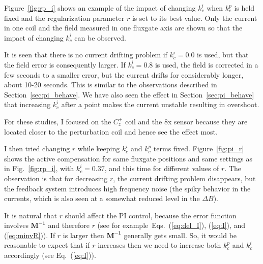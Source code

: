 Figure~\ref{fig:rp_i} shows an example of the impact of changing
$k_c^i$ when $k_c^p$ is held fixed and the regularization parameter
$r$ is set to its best value.  Only the current in one coil and the
field measured in one fluxgate axis are shown so that the impact of
changing $k_c^i$ can be observed.

It is seen that there is no current drifting problem if $k_c^i=0.0$ is
used, but that the field error is consequently larger.  If $k_c^i=0.8$
is used, the field is corrected in a few seconds to a smaller error,
but the current drifts for considerably longer, about 10-20 seconds.
This is similar to the observations described in
Section~\ref{sec:pi_behave}.  We have also seen the effect in
Section~\ref{sec:pi_behave} that increasing $k_c^i$ after a point
makes the current unstable resulting in overshoot.

For these studies, I focused on the $C_z^+$ coil and the 8x sensor
because they are located closer to the perturbation coil and hence see the effect most.



I then tried changing $r$ while keeping $k_c^i$ and $k_c^p$ terms
fixed.  Figure~\ref{fig:pi_r} shows the active compensation for same
fluxgate positions and same settings as in Fig.~\ref{fig:rp_i}, with
$k_c^i=0.37$, and this time for different values of $r$. The
observation is that for decreasing $r$, the current drifting problem
disappears, but the feedback system introduces high frequency noise (the spiky behavior in the currents, which is also seen at a somewhat reduced level in the $\Delta B$).

It is natural that $r$ should affect the PI control, because the error
function involves $\bm{M^{-1}}$ and therefore $r$ (see
for example~Eqs.~(\ref{eq:del_I}), (\ref{eq:I}), and (\ref{eq:minvR})).  If
$r$ is larger then $\bm{M^{-1}}$ generally gets small.  So, it would be
reasonable to expect that if $r$ increases then we need to increase
both $k_c^p$ and $k_c^i$ accordingly (see Eq.~(\ref{eq:I})).


